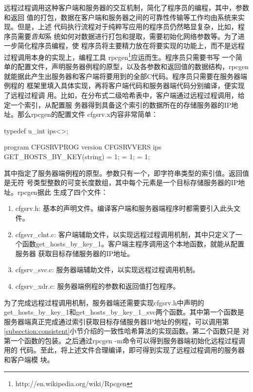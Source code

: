 远程过程调用这种客户端和服务器的交互机制，简化了程序员的编程，其中，参数和返回
值的打包，数据在客户端和服务器之间的可靠性传输等工作均由系统来实现。但是，上述
代码执行流程对于纯粹写应用的程序员仍然略显复杂，比如，程序员需要\emph{告知}系
统如何对数据进行打包和提取，需要初始化网络参数等。为了进一步简化程序员编程，使
程序员将主要精力放在将要实现的功能上，而不是远程过程调用本身的实现上，编程工具
rpcgen\footnote{http://en.wikipedia.org/wiki/Rpcgen}应运而生。程序员只需要书写
一个简单的配置文件，声明服务器例程的原型，以及各参数和返回值的数据结构，rpcgen
就能据此产生出服务器和客户端将要用到的全部C代码。程序员只需要在服务器端例程的
框架里填入具体实现，再将客户端代码和服务器端代码分别编译，便实现了远程过程调
用。比如，在分布式二级哈希表中，客户端通过远程过程调用，给定一个索引，从配置服
务器得到具备这个索引的数据所在的存储服务器的IP地址。那么rpcgen的配置文件
cfgsrv.x内容非常简单：
\begin{code}
typedef u_int ips<>;

program CFGSRVPROG {
  version CFGSRVVERS {
    ips GET_HOSTS_BY_KEY(string) = 1;
  } = 1;
} = 1;
\end{code}
其中指定了服务器端例程的原型。参数只有一个，即字符串类型的索引值。返回值是无符
号类型整数的可变长度数组，其中每个元素是一个目标存储服务器的IP地址。rpcgen据此
生成了四个文件：
\begin{enumerate}
  \item cfgsrv.h: 基本的声明文件。编译客户端和服务器端程序时都需要引入此头文
  件。
  \item cfgsvr\_clnt.c: 客户端辅助文件，以实现远程过程调用机制，其中只定义了一
  个函数get\_hosts\_by\_key\_1。客户端主程序调用这个本地函数，就能从配置服务器
  获取目标存储服务器的IP地址。
  \item cfgsrv\_svc.c: 服务器端辅助文件，以实现远程过程调用机制。
  \item cfgsrv\_xdr.c: 服务器端例程的参数和返回值打包程序。
\end{enumerate}
为了完成远程过程调用机制，服务器端还需要实现cfgsrv.h中声明的
get\_hosts\_by\_key\_1和get\_hosts\_by\_key\_1\_svc两个函数。其中第一个函数是
服务器端真正完成通过索引获取目标存储服务器IP地址的例程，可以调用第
\ref{subsection:consistent}小节介绍的一致性哈希算法的实现函数。第二个函数只是
对第一个函数的包装。之后通过rpcgen -m命令可以得到服务器端初始化远程过程调用的
代码。至此，将上述文件合理编译，即可得到实现了远程过程调用的服务器和客户端模
块。

